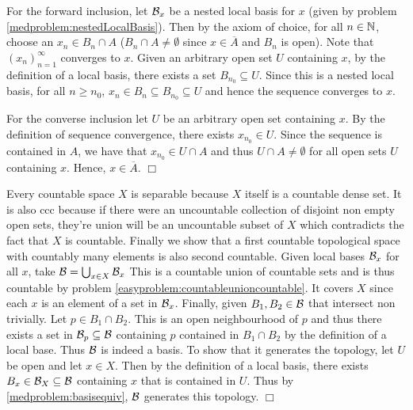 \documentclass{article}
\begin{document}
 {
    For the forward inclusion, let $\mathcal{B}_{x}$ be a nested local basis for $x$ (given by problem \ref{medproblem:nestedLocalBasis}). Then by the axiom of choice, for all $n\in \mathbb{N}$, choose an $x_{n}\in B_{n}\cap A$ ($B_{n}\cap A\neq \emptyset$ since $x\in \overline{A}$ and $B_{n}$ is open). Note that $(x_{n})_{n = 1}^{\infty}$ converges to $x$. Given an arbitrary open set $U$ containing $x$, by the definition of a local basis, there exists a set $B_{n_{0}}\subseteq U$. Since this is a nested local basis, for all $n\geq n_{0}$, $x_{n}\in B_{n}\subseteq B_{n_{0}}\subseteq U$ and hence the sequence converges to $x$. 
    
    For the converse inclusion let $U$ be an arbitrary open set containing $x$. By the definition of sequence convergence, there exists $x_{n_{0}}\in U$. Since the sequence is contained in $A$, we have that $x_{n_{0}}\in U\cap A$ and thus $U\cap A\neq \emptyset$ for all open sets $U$ containing $x$. Hence, $x\in \overline{A}$. $\Box$ 
}

 {
    Every countable space $X$ is separable because $X$ itself is a countable dense set. It is also ccc because if there were an uncountable collection of disjoint non empty open sets, they're union will be an uncountable subset of $X$ which contradicts the fact that $X$ is countable. Finally we show that a first countable topological space with countably many elements is also second countable. Given local bases $\mathcal{B}_{x}$ for all $x$, take $\mathcal{B} = \bigcup_{x\in X}\mathcal{B}_{x}$ This is a countable union of countable sets and is thus countable by problem \ref{easyproblem:countableunioncountable}. It covers $X$ since each $x$ is an element of a set in $\mathcal{B}_{x}$. Finally, given $B_{1}, B_{2}\in \mathcal{B}$ that intersect non trivially. Let $p\in B_{1}\cap B_{2}$. This is an open neighbourhood of $p$ and thus there exists a set in $\mathcal{B}_{p}\subseteq \mathcal{B}$ containing $p$ contained in $B_{1}\cap B_{2}$ by the definition of a local base. Thus $\mathcal{B}$ is indeed a basis. To show that it generates the topology, let $U$ be open and let $x\in X$. Then by the definition of a local basis, there exists $B_{x}\in \mathcal{B}_{X}\subseteq \mathcal{B}$ containing $x$ that is contained in $U$. Thus by \ref{medproblem:basisequiv}, $\mathcal{B}$ generates this topology. $\Box$
}

 {
    
}
\end{document}
